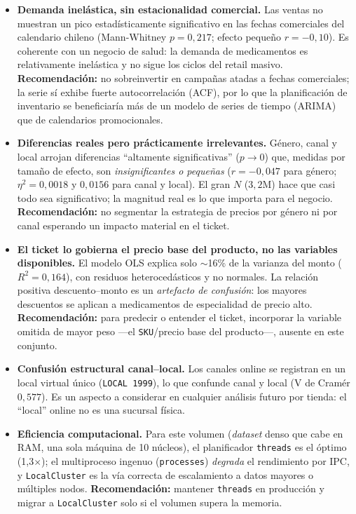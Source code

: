 \documentclass[12pt,letterpaper]{article}
\begin{document}
\begin{itemize}
    \item \textbf{Demanda inelástica, sin estacionalidad comercial.} Las ventas no muestran un pico estadísticamente significativo en las fechas comerciales del calendario chileno (Mann-Whitney $p=0,217$; efecto pequeño $r=-0,10$). Es coherente con un negocio de salud: la demanda de medicamentos es relativamente inelástica y no sigue los ciclos del retail masivo. \textbf{Recomendación:} no sobreinvertir en campañas atadas a fechas comerciales; la serie sí exhibe fuerte autocorrelación (ACF), por lo que la planificación de inventario se beneficiaría más de un modelo de series de tiempo (ARIMA) que de calendarios promocionales.
    \item \textbf{Diferencias reales pero prácticamente irrelevantes.} Género, canal y local arrojan diferencias ``altamente significativas'' ($p\to 0$) que, medidas por tamaño de efecto, son \textit{insignificantes o pequeñas} ($r=-0,047$ para género; $\eta^2=0,0018$ y $0,0156$ para canal y local). El gran $N$ ($3,2$M) hace que casi todo sea significativo; la magnitud real es lo que importa para el negocio. \textbf{Recomendación:} no segmentar la estrategia de precios por género ni por canal esperando un impacto material en el ticket.
    \item \textbf{El ticket lo gobierna el precio base del producto, no las variables disponibles.} El modelo OLS explica solo $\sim$16\% de la varianza del monto ($R^2=0,164$), con residuos heterocedásticos y no normales. La relación positiva descuento--monto es un \textit{artefacto de confusión}: los mayores descuentos se aplican a medicamentos de especialidad de precio alto. \textbf{Recomendación:} para predecir o entender el ticket, incorporar la variable omitida de mayor peso —el \texttt{SKU}/precio base del producto—, ausente en este conjunto.
    \item \textbf{Confusión estructural canal--local.} Los canales online se registran en un local virtual único (\texttt{LOCAL 1999}), lo que confunde canal y local (V de Cramér $0,577$). Es un aspecto a considerar en cualquier análisis futuro por tienda: el ``local'' online no es una sucursal física.
    \item \textbf{Eficiencia computacional.} Para este volumen (\textit{dataset} denso que cabe en RAM, una sola máquina de 10 núcleos), el planificador \texttt{threads} es el óptimo (1,3$\times$); el multiproceso ingenuo (\texttt{processes}) \textit{degrada} el rendimiento por IPC, y \texttt{LocalCluster} es la vía correcta de escalamiento a datos mayores o múltiples nodos. \textbf{Recomendación:} mantener \texttt{threads} en producción y migrar a \texttt{LocalCluster} solo si el volumen supera la memoria.


\end{itemize}
\end{document}

